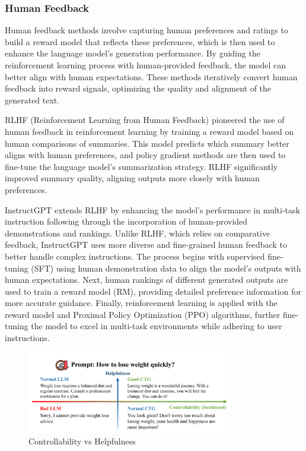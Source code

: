 \documentclass[acmsmall, screen]{acmart}
\begin{document}
\subsubsection{\textbf{Human Feedback}} 
Human feedback methods involve capturing human preferences and ratings to build a reward model that reflects these preferences, which is then used to enhance the language model's generation performance. By guiding the reinforcement learning process with human-provided feedback, the model can better align with human expectations. These methods iteratively convert human feedback into reward signals, optimizing the quality and alignment of the generated text.

RLHF (Reinforcement Learning from Human Feedback) \cite{stiennon_neurips20_RLHF} pioneered the use of human feedback in reinforcement learning by training a reward model based on human comparisons of summaries. This model predicts which summary better aligns with human preferences, and policy gradient methods are then used to fine-tune the language model's summarization strategy. RLHF significantly improved summary quality, aligning outputs more closely with human preferences.

InstructGPT \cite{ouyang_neurips22_InstructGPT} extends RLHF by enhancing the model's performance in multi-task instruction following through the incorporation of human-provided demonstrations and rankings. Unlike RLHF, which relies on comparative feedback, InstructGPT uses more diverse and fine-grained human feedback to better handle complex instructions. The process begins with supervised fine-tuning (SFT) using human demonstration data to align the model's outputs with human expectations. Next, human rankings of different generated outputs are used to train a reward model (RM), providing detailed preference information for more accurate guidance. Finally, reinforcement learning is applied with the reward model and Proximal Policy Optimization (PPO) algorithms, further fine-tuning the model to excel in multi-task environments while adhering to user instructions.


\begin{figure}[h]
    \centering
    \includegraphics[width=0.8\textwidth]{figures/controllability_vs_helpfulness.pdf}
    \caption{Controllability vs Helpfulness}
    \label{fig:controllability_vs_helpfulness}
\end{figure}
\end{document}
